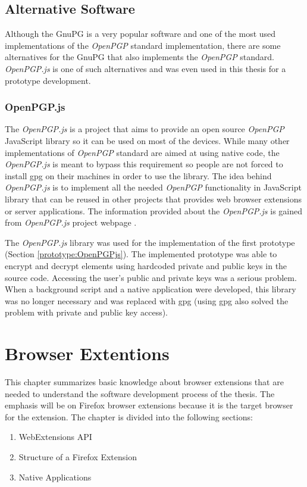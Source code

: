 \section{Alternative Software}
Although the GnuPG is a very popular software and one of the most used implementations of the \textit{OpenPGP} standard implementation, there are some alternatives for the GnuPG that also implements the \textit{OpenPGP} standard. \textit{OpenPGP.js} is one of such alternatives and was even used in this thesis for a prototype development.

\subsection*{OpenPGP.js}
\label{text:openpgpjs}
The \textit{OpenPGP.js} is a project that aims to provide an open source \textit{OpenPGP} JavaScript library so it can be used on most of the devices. While many other implementations of \textit{OpenPGP} standard are aimed at using native code, the \textit{OpenPGP.js} is meant to bypass this requirement so people are not forced to install gpg on their machines in order to use the library. The idea behind \textit{OpenPGP.js} is to implement all the needed \textit{OpenPGP} functionality in JavaScript library that can be reused in other projects that provides web browser extensions or server applications. The information provided about the \textit{OpenPGP.js} is gained from \textit{OpenPGP.js} project webpage \cite{OpenPGPjs}.

The \textit{OpenPGP.js} library was used for the implementation of the first prototype (Section \ref{prototype:OpenPGPjs}). The implemented prototype was able to encrypt and decrypt elements using hardcoded private and public keys in the source code. Accessing the user's public and private keys was a serious problem. When a background script and a native application were developed, this library was no longer necessary and was replaced with gpg (using gpg also solved the problem with private and public key access).

\chapter{Browser Extentions}
This chapter summarizes basic knowledge about browser extensions that are needed to understand the software development process of the thesis. The emphasis will be on Firefox browser extensions because it is the target browser for the extension. The chapter is divided into the following sections:
\begin{enumerate}
    \item WebExtensions API
    \item Structure of a Firefox Extension
    \item Native Applications
\end{enumerate}

